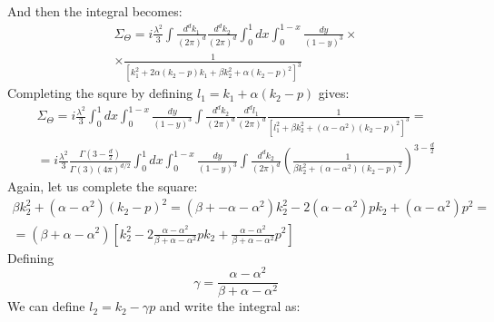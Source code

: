 \documentclass{article}
\begin{document}
And then the integral becomes:
\begin{equation}
\begin{gathered}
    \Sigma_\Theta = i\frac{\lambda^2}{3} \int \frac{d^dk_1}{(2\pi)^d} \frac{d^dk_2}{(2\pi)^d} \int_0^1 dx \int_0^{1-x} \frac{dy}{(1 - y)^3} \times \\ \times \frac{1}{\left[
        k_1^2 + 2\alpha(k_2 - p)k_1 + \beta k_2^2 + \alpha(k_2 - p)^2
    \right]^3}
\end{gathered}
\end{equation}
Completing the squre by defining $l_1 = k_1 + \alpha(k_2 - p)$ gives:
\begin{equation}
\begin{gathered}
    \Sigma_\Theta = i\frac{\lambda^2}{3} \int_0^1 dx \int_0^{1-x} \frac{dy}{(1 - y)^3} \int \frac{d^dk_2}{(2\pi)^d} \frac{d^dl_1}{(2\pi)^d} \frac{1}{\left[
        l_1^2 + \beta k_2^2 + (\alpha - \alpha^2)(k_2 - p)^2
    \right]^3} = \\ =
    i\frac{\lambda^2}{3} \frac{\Gamma\left(3 - \frac{d}{2}\right)}{\Gamma(3)(4\pi)^{d/2}} \int_0^1 dx \int_0^{1-x} \frac{dy}{(1 - y)^3} \int \frac{d^dk_2}{(2\pi)^d} \left(
        \frac{1}{\beta k_2^2 + (\alpha - \alpha^2)(k_2 - p)^2}
    \right)^{3 - \frac{d}{2}}
\end{gathered}
\end{equation}
Again, let us complete the square:
\begin{equation}
\begin{gathered}
    \beta k_2^2 + (\alpha - \alpha^2)(k_2 - p)^2 = (\beta +- \alpha - \alpha^2)k_2^2 - 2(\alpha - \alpha^2)pk_2 + (\alpha - \alpha^2)p^2 = \\ =
    (\beta + \alpha - \alpha^2)\left[
        k_2^2 - 2\frac{\alpha - \alpha^2}{\beta + \alpha - \alpha^2}pk_2 + \frac{\alpha - \alpha^2}{\beta + \alpha - \alpha^2}p^2
    \right]
\end{gathered}
\end{equation}
Defining
\begin{equation}
    \gamma = \frac{\alpha - \alpha^2}{\beta + \alpha - \alpha^2}
\end{equation}
We can define $l_2 = k_2 - \gamma p$ and write the integral as:
\end{document}
